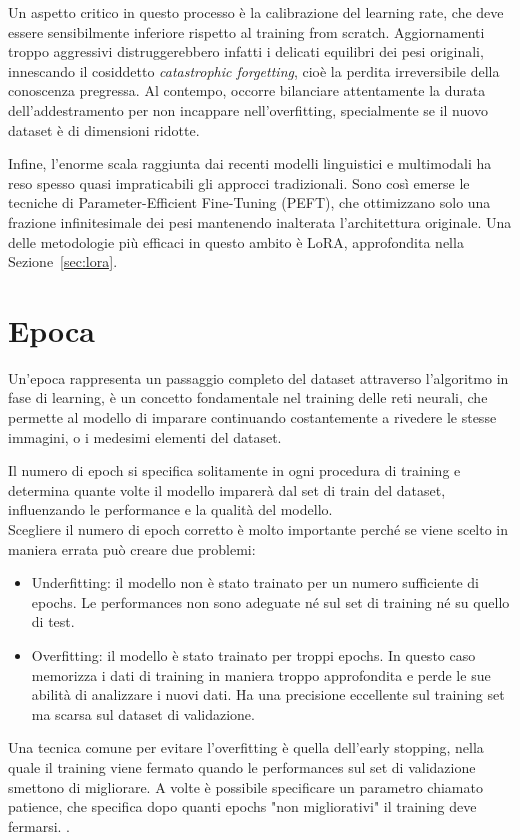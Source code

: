Un aspetto critico in questo processo è la calibrazione del learning rate, che deve essere sensibilmente inferiore rispetto al training from scratch.
Aggiornamenti troppo aggressivi distruggerebbero infatti i delicati equilibri dei pesi originali, innescando il cosiddetto \textit{catastrophic forgetting}, cioè la perdita irreversibile della conoscenza pregressa.
Al contempo, occorre bilanciare attentamente la durata dell'addestramento per non incappare nell'overfitting, specialmente se il nuovo dataset è di dimensioni ridotte.

Infine, l'enorme scala raggiunta dai recenti modelli linguistici e multimodali ha reso spesso quasi impraticabili gli approcci tradizionali.
Sono così emerse le tecniche di Parameter-Efficient Fine-Tuning (PEFT), che ottimizzano solo una frazione infinitesimale dei pesi mantenendo inalterata l'architettura originale.
Una delle metodologie più efficaci in questo ambito è LoRA, approfondita nella Sezione~\ref{sec:lora}.

\newpage

\section{Epoca}
Un'\hypertarget{epoch}{epoca} rappresenta un passaggio completo del dataset attraverso l'algoritmo in fase di learning, è un concetto fondamentale nel training delle reti neurali,
che permette al modello di imparare continuando costantemente a rivedere le stesse immagini, o i medesimi elementi del dataset.

Il numero di epoch si specifica solitamente in ogni procedura di training e determina quante volte il modello imparerà dal set di train del dataset, influenzando le performance e la qualità del modello.\\

\noindent
Scegliere il numero di epoch corretto è molto importante perché se viene scelto in maniera errata può creare due problemi:
\begin{itemize}
    \item Underfitting: il modello non è stato trainato per un numero sufficiente di epochs.
    Le performances non sono adeguate né sul set di training né su quello di test.
    
    \item Overfitting: il modello è stato trainato per troppi epochs.
    In questo caso memorizza i dati di training in maniera troppo approfondita e perde le sue abilità di analizzare i nuovi dati. Ha una precisione eccellente sul training set ma scarsa sul dataset di validazione.
\end{itemize}

Una tecnica comune per evitare l'overfitting è quella dell'early stopping, nella quale il training viene fermato quando le performances sul set di validazione smettono di migliorare.
A volte è possibile specificare un parametro chiamato patience, che specifica dopo quanti epochs "non migliorativi" il training deve fermarsi. \cite{epoch_ultralytics}.
